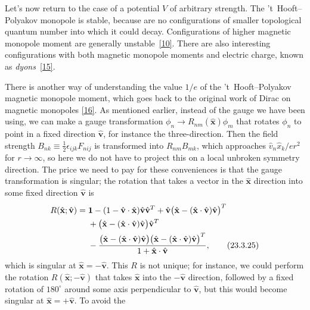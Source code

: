 Let's now return to the case of a potential $V$ of arbitrary strength. The
't~Hooft--Polyakov monopole is stable, because are no configurations of
smaller topological quantum number into which it could decay.
Configurations of higher magnetic monopole moment are generally
unstable~\hyperref[ch23-ref-10]{[10]}. There are also interesting
configurations with both magnetic monopole moments and electric charge,
known as \emph{dyons}~\hyperref[ch23-ref-15]{[15]}.

There is another way of understanding the value $1/e$ of the
't~Hooft--Polyakov magnetic monopole moment, which goes back to the
original work of Dirac on magnetic monopoles \hyperref[ch23-ref-16]{[16]}.
As mentioned earlier, instead of the gauge we have been using, we can make
a gauge transformation
$\phi_n\to R_{nm}(\hat{\mathbf x})\phi_m$ that rotates $\phi_n$ to point
in a fixed direction $\hat{\mathbf v}$, for instance the three-direction.
Then the field strength
$B_{nk}\equiv\frac12\epsilon_{ijk}F_{nij}$ is transformed into
$R_{nm}B_{mk}$, which approaches
$\hat v_n\hat x_k/er^2$ for $r\to\infty$, so here we do not have to
project this on a local unbroken symmetry direction. The price we need to
pay for these conveniences is that the gauge transformation is singular;
the rotation that takes a vector in the $\hat{\mathbf x}$ direction into
some fixed direction $\hat{\mathbf v}$ is
\begin{align}
 R(\hat{\mathbf x};\hat{\mathbf v})={}&
 \mathbf 1-(1-\hat{\mathbf v}\cdot\hat{\mathbf x})
 \hat{\mathbf v}\hat{\mathbf v}^{T}
 +\hat{\mathbf v}
 \bigl(\hat{\mathbf x}-(\hat{\mathbf x}\cdot\hat{\mathbf v})
 \hat{\mathbf v}\bigr)^{T}
 \notag\\
 &+\bigl(\hat{\mathbf x}-(\hat{\mathbf x}\cdot\hat{\mathbf v})
 \hat{\mathbf v}\bigr)\hat{\mathbf v}^{T}
 \notag\\
 &-\frac{
 \bigl(\hat{\mathbf x}-(\hat{\mathbf x}\cdot\hat{\mathbf v})
 \hat{\mathbf v}\bigr)
 \bigl(\hat{\mathbf x}-(\hat{\mathbf x}\cdot\hat{\mathbf v})
 \hat{\mathbf v}\bigr)^{T}}
 {1+\hat{\mathbf x}\cdot\hat{\mathbf v}},
 \tag{23.3.25}\label{eq:23.3.25}
\end{align}
which is singular at $\hat{\mathbf x}=-\hat{\mathbf v}$. This $R$ is not
unique; for instance, we could perform the rotation
$R(\hat{\mathbf x};-\hat{\mathbf v})$ that takes $\hat{\mathbf x}$ into
the $-\hat{\mathbf v}$ direction, followed by a fixed rotation of
$180^\circ$ around some axis perpendicular to $\hat{\mathbf v}$, but this
would become singular at $\hat{\mathbf x}=+\hat{\mathbf v}$. To avoid the
